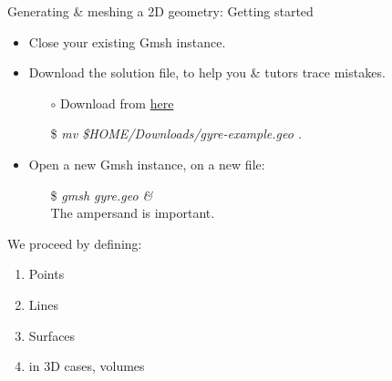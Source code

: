 \documentclass[t]{beamer}
\begin{document}
\begin{frame}{Generating \& meshing a 2D geometry: Getting started}
    \begin{itemize}
        \item Close your existing Gmsh instance.
        \item Download the solution file, to help you \& tutors trace mistakes.
        \begin{itemize}
            \item[$\circ$] Download from \href{http://figshare.com/s/85271e16603d11e4840b06ec4bbcf141}{here}
            \item[\$] \emph{mv \$HOME/Downloads/gyre-example.geo .}
        \end{itemize}
        \item Open a new Gmsh instance, on a new file:
        \begin{itemize}
            \item[\$] \emph{gmsh gyre.geo \&} \\ \hspace{10pt} The ampersand is important.\vspace{10pt}
        \end{itemize}
    \end{itemize}
    We proceed by defining:
    \begin{enumerate}
        \item Points
        \item Lines
        \item Surfaces
        \item in 3D cases, volumes
    \end{enumerate}
\end{frame}
\end{document}

